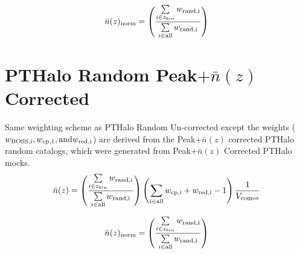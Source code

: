 \documentclass[letterpaper]{article}
\begin{document}
\begin{equation}
\bar{n}(z)_{\rm{norm}} = \left(\frac{\sum\limits_{i \in z_{bin}} w_{\rm{rand},i} }{\sum\limits_{i \in \rm{all}} w_{\rm{rand},i} } \right)
\end{equation}

\section{PTHalo Random Peak$+\bar{n}(z)$ Corrected}
\noindent Same weighting scheme as PTHalo Random Un-corrected except the weights ($w_{\rm{BOSS},i}, w_{\rm{cp},1}, \text{and} w_{\rm{red},i}$) are derived from the Peak$+\bar{n}(z)$ corrected PTHalo random catalogs, which were generated from Peak$+\bar{n}(z)$ Corrected PTHalo mocks.
\begin{equation}
\bar{n}(z) = \left(\frac{\sum\limits_{i \in z_{bin}} w_{\rm{rand},i} }{\sum\limits_{i \in \rm{all}} w_{\rm{rand},i} } \right) \left(\sum\limits_{i \in \rm{all}} w_{\rm{cp},i} + w_{\rm{red},i}-1 \right) \frac{1}{V_{\rm{comov}}}
\end{equation}

\begin{equation}
\bar{n}(z)_{\rm{norm}} = \left(\frac{\sum\limits_{i \in z_{bin}} w_{\rm{rand},i} }{\sum\limits_{i \in \rm{all}} w_{\rm{rand},i} } \right)
\end{equation}
\end{document}
